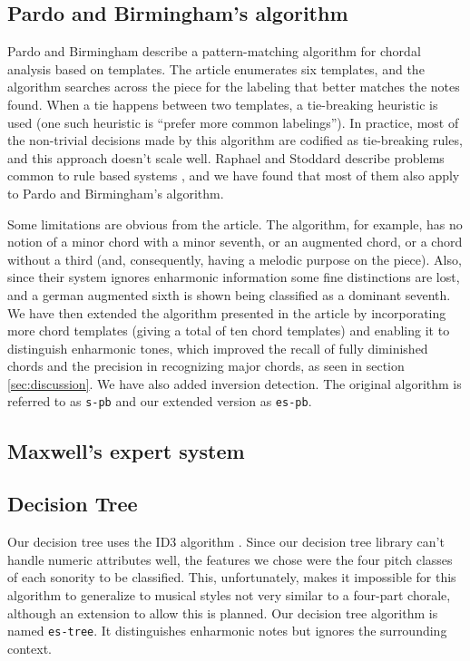 \documentclass{article}
\begin{document}
\subsection{Pardo and Birmingham's algorithm}
\label{sec:pardo}


Pardo and Birmingham \cite{pardo.ea:algorithms} describe a
pattern-matching algorithm for chordal analysis based on templates.
The article enumerates six templates, and the algorithm searches
across the piece for the labeling that better matches the notes found.
When a tie happens between two templates, a tie-breaking heuristic is
used (one such heuristic is ``prefer more common labelings''). In
practice, most of the non-trivial decisions made by this algorithm are
codified as tie-breaking rules, and this approach doesn't scale
well. Raphael and Stoddard describe problems common to rule based
systems \cite{raphael.ea:harmonic}, and we have found that most of
them also apply to Pardo and Birmingham's algorithm.

Some limitations are obvious from the article. The algorithm, for
example, has no notion of a minor chord with a minor seventh, or an
augmented chord, or a chord without a third (and, consequently, having
a melodic purpose on the piece). Also, since their system ignores
enharmonic information some fine distinctions are lost, and a german
augmented sixth is shown being classified as a dominant seventh. We
have then extended the algorithm presented in the article by
incorporating more chord templates (giving a total of ten chord
templates) and enabling it to distinguish enharmonic tones, which
improved the recall of fully diminished chords and the precision in
recognizing major chords, as seen in section \ref{sec:discussion}.  We
have also added inversion detection. The original algorithm is
referred to as \texttt{s-pb} and our extended version as
\texttt{es-pb}.

\subsection{Maxwell's expert system}
\label{sec:maxwell}


\subsection{Decision Tree}
\label{sec:tree}

Our decision tree uses the ID3 algorithm
\cite{mitchell:machine}. Since our decision tree library can't handle
numeric attributes well, the features we chose were the four pitch
classes of each sonority to be classified. This, unfortunately, makes
it impossible for this algorithm to generalize to musical styles not
very similar to a four-part chorale, although an extension to allow
this is planned. Our decision tree algorithm is named
\texttt{es-tree}. It distinguishes enharmonic notes but ignores the
surrounding context.
\end{document}
